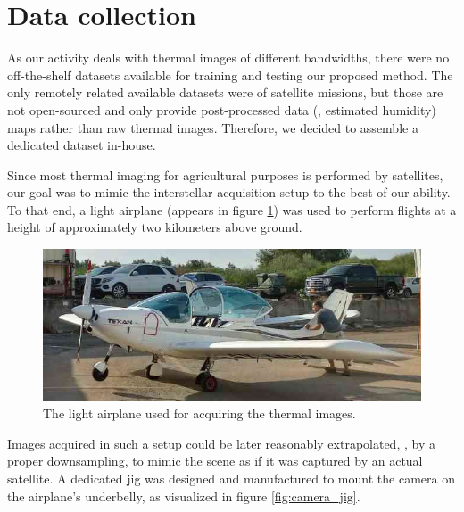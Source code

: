 \section{Data collection}
As our activity deals with thermal images of different bandwidths, there were no off-the-shelf datasets available for training and testing our proposed method.
The only remotely related available datasets were of satellite missions, but those are not open-sourced and only provide post-processed data (\eg, estimated humidity) maps rather than raw thermal images.
Therefore, we decided to assemble a dedicated dataset in-house.

Since most thermal imaging for agricultural purposes is performed by satellites, our goal was to mimic the interstellar acquisition setup to the best of our ability.
To that end, a light airplane (appears in figure \ref{fig:light_airplane}) was used to perform flights at a height of approximately two kilometers above ground.
\begin{figure}[H]
    \centering
    \includegraphics[width=0.8\linewidth]{../figs/data/light_airplane.jpeg}
    \caption{The light airplane used for acquiring the thermal images.}
    \label{fig:light_airplane}
\end{figure}
Images acquired in such a setup could be later reasonably extrapolated, \eg, by a proper downsampling, to mimic the scene as if it was captured by an actual satellite.
A dedicated jig was designed and manufactured to mount the camera on the airplane's underbelly, as visualized in figure \ref{fig:camera_jig}.
